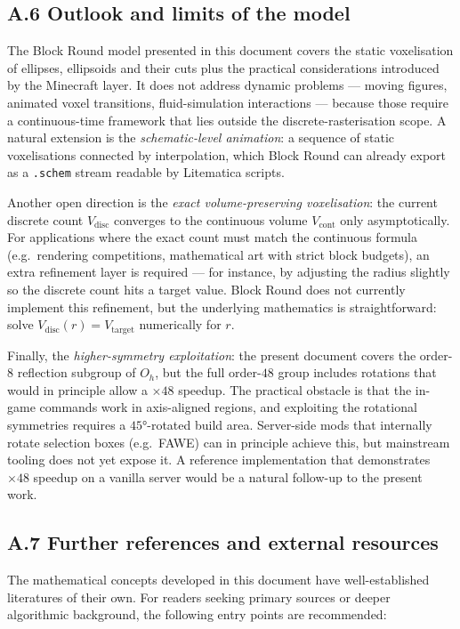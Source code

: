 \documentclass[12pt,a4paper]{scrartcl}
\newcommand{\code}[1]{\texttt{\small #1}}
\begin{document}
\subsection*{A.6 Outlook and limits of the model}

The Block Round model presented in this document covers the static voxelisation of ellipses, ellipsoids and their cuts plus the practical considerations introduced by the Minecraft layer. It does not address dynamic problems --- moving figures, animated voxel transitions, fluid-simulation interactions --- because those require a continuous-time framework that lies outside the discrete-rasterisation scope. A natural extension is the \emph{schematic-level animation}: a sequence of static voxelisations connected by interpolation, which Block Round can already export as a \code{.schem} stream readable by Litematica scripts.

Another open direction is the \emph{exact volume-preserving voxelisation}: the current discrete count $V_{\mathrm{disc}}$ converges to the continuous volume $V_{\mathrm{cont}}$ only asymptotically. For applications where the exact count must match the continuous formula (e.g.\ rendering competitions, mathematical art with strict block budgets), an extra refinement layer is required --- for instance, by adjusting the radius slightly so the discrete count hits a target value. Block Round does not currently implement this refinement, but the underlying mathematics is straightforward: solve $V_{\mathrm{disc}}(r) = V_{\mathrm{target}}$ numerically for $r$.

Finally, the \emph{higher-symmetry exploitation}: the present document covers the order-$8$ reflection subgroup of $O_h$, but the full order-$48$ group includes rotations that would in principle allow a $\times 48$ speedup. The practical obstacle is that the in-game commands work in axis-aligned regions, and exploiting the rotational symmetries requires a $45°$-rotated build area. Server-side mods that internally rotate selection boxes (e.g.\ FAWE) can in principle achieve this, but mainstream tooling does not yet expose it. A reference implementation that demonstrates $\times 48$ speedup on a vanilla server would be a natural follow-up to the present work.

\subsection*{A.7 Further references and external resources}

The mathematical concepts developed in this document have well-established literatures of their own. For readers seeking primary sources or deeper algorithmic background, the following entry points are recommended:
\end{document}
